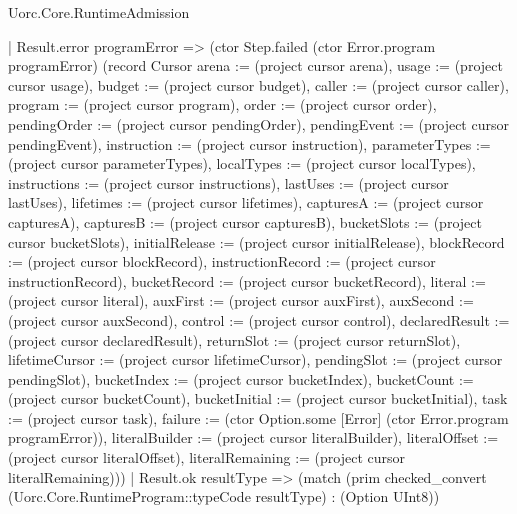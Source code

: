 \begin{lexlean}{Uorc.Core.RuntimeAdmission}
\begin{semanticmodule}
{          | Result.error programError => (ctor Step.failed (ctor Error.program programError) (record Cursor {arena := (project cursor arena), usage := (project cursor usage), budget := (project cursor budget), caller := (project cursor caller), program := (project cursor program), order := (project cursor order), pendingOrder := (project cursor pendingOrder), pendingEvent := (project cursor pendingEvent), instruction := (project cursor instruction), parameterTypes := (project cursor parameterTypes), localTypes := (project cursor localTypes), instructions := (project cursor instructions), lastUses := (project cursor lastUses), lifetimes := (project cursor lifetimes), capturesA := (project cursor capturesA), capturesB := (project cursor capturesB), bucketSlots := (project cursor bucketSlots), initialRelease := (project cursor initialRelease), blockRecord := (project cursor blockRecord), instructionRecord := (project cursor instructionRecord), bucketRecord := (project cursor bucketRecord), literal := (project cursor literal), auxFirst := (project cursor auxFirst), auxSecond := (project cursor auxSecond), control := (project cursor control), declaredResult := (project cursor declaredResult), returnSlot := (project cursor returnSlot), lifetimeCursor := (project cursor lifetimeCursor), pendingSlot := (project cursor pendingSlot), bucketIndex := (project cursor bucketIndex), bucketCount := (project cursor bucketCount), bucketInitial := (project cursor bucketInitial), task := (project cursor task), failure := (ctor Option.some [Error] (ctor Error.program programError)), literalBuilder := (project cursor literalBuilder), literalOffset := (project cursor literalOffset), literalRemaining := (project cursor literalRemaining)}))
          | Result.ok resultType => (match (prim checked_convert (Uorc.Core.RuntimeProgram::typeCode resultType) : (Option UInt8))
}
\end{semanticmodule}
\end{lexlean}
